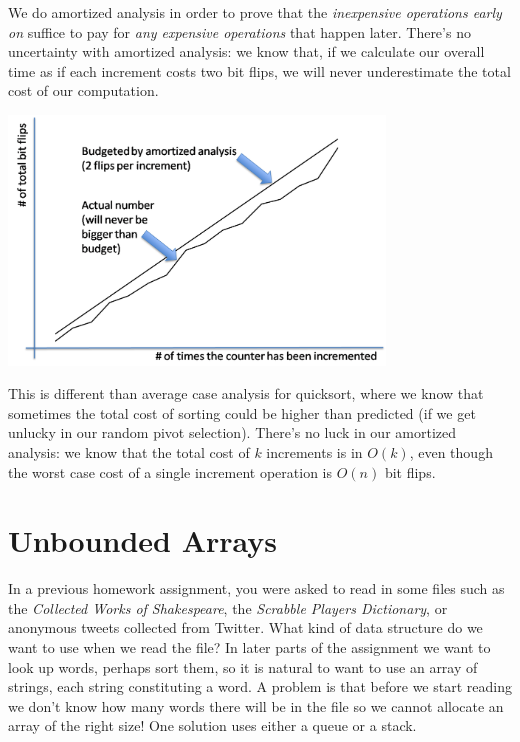 We do amortized analysis in order to prove that the
\emph{inexpensive operations early on} suffice to pay for
\emph{any expensive operations} that happen later. There's no
uncertainty with amortized analysis: we know that, if we calculate our
overall time as if each increment costs two bit flips, we will never
underestimate the total cost of our computation.
\begin{center}
\includegraphics[width=0.75\textwidth]{img/bitflip-graph.png}
\end{center}

This is different than average case analysis for quicksort, where we
know that sometimes the total cost of sorting could be higher than
predicted (if we get unlucky in our random pivot selection). There's
no luck in our amortized analysis: we know that the total cost of $k$
increments is in $O(k)$, even though the worst case cost of a single
increment operation is $O(n)$ bit flips.


\section{Unbounded Arrays}
\label{sec:ubarrays:arrays}

In a previous homework assignment, you were asked to read in some
files such as the \emph{Collected Works of Shakespeare}, the
\emph{Scrabble Players Dictionary}, or anonymous tweets collected from
Twitter.  What kind of data structure do we want to use when we read
the file?  In later parts of the assignment we want to look up words,
perhaps sort them, so it is natural to want to use an array of
strings, each string constituting a word.  A problem is that before we
start reading we don't know how many words there will be in the file
so we cannot allocate an array of the right size!  One solution uses
either a queue or a stack.

